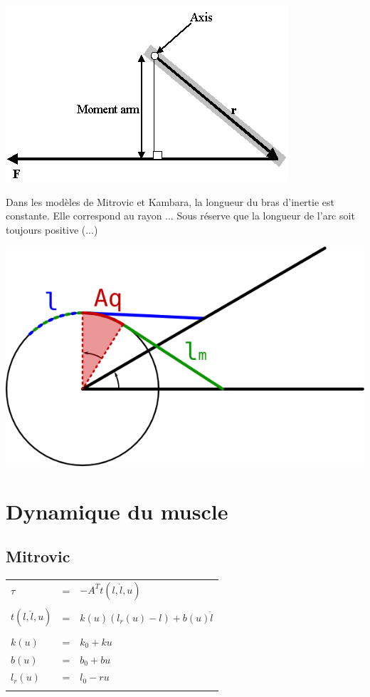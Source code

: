 \documentclass[pdftex,a4paper,11pt]{article}
\numberwithin{equation}{subsection}
\begin{document}
\begin{center}
        \includegraphics[width=.50\linewidth]{fig/moment_arm}
\end{center}

Dans les modèles de Mitrovic et Kambara, la longueur du bras d'inertie est constante. Elle correspond au rayon ...
Sous réserve que la longueur de l'arc soit toujours positive (...)

\begin{center}
        \includegraphics[width=.50\linewidth]{fig/muscle_length}
\end{center}


\section{Dynamique du muscle}

\subsection{Mitrovic}

\begin{tabular}{lcl}
    $\tau$ & = & $-A^T t(l, \dot{l}, u)$ \\
    \\
    $t(l, \dot{l}, u)$        & = & $k(u) (l_r(u) - l) + b(u) \dot{l}$ \\
    \\
    $k(u)$    & = & $k_0 + k u$ \\
    $b(u)$    & = & $b_0 + b u$ \\
    $l_r(u)$  & = & $l_0 - r u$ \\
    \\
\end{tabular}
\end{document}
